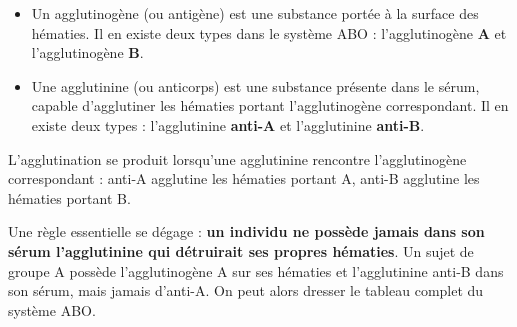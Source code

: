 \documentclass[11pt]{article}
\newcommand{\cle}[1]{{\popxbold\color{popdark}#1}}
\begin{document}
\begin{definition}
\begin{itemize}
\item Un \cle{agglutinogène} (ou \cle{antigène}) est une substance portée à la surface des hématies. Il en existe deux types dans le système ABO : l'agglutinogène \textbf{A} et l'agglutinogène \textbf{B}.
\item Une \cle{agglutinine} (ou \cle{anticorps}) est une substance présente dans le sérum, capable d'agglutiner les hématies portant l'agglutinogène correspondant. Il en existe deux types : l'agglutinine \textbf{anti-A} et l'agglutinine \textbf{anti-B}.
\end{itemize}
L'agglutination se produit lorsqu'une agglutinine rencontre l'agglutinogène correspondant : anti-A agglutine les hématies portant A, anti-B agglutine les hématies portant B.
\end{definition}

Une règle essentielle se dégage : \textbf{un individu ne possède jamais dans son sérum l'agglutinine qui détruirait ses propres hématies}. Un sujet de groupe A possède l'agglutinogène A sur ses hématies et l'agglutinine anti-B dans son sérum, mais jamais d'anti-A. On peut alors dresser le tableau complet du système ABO.
\end{document}
